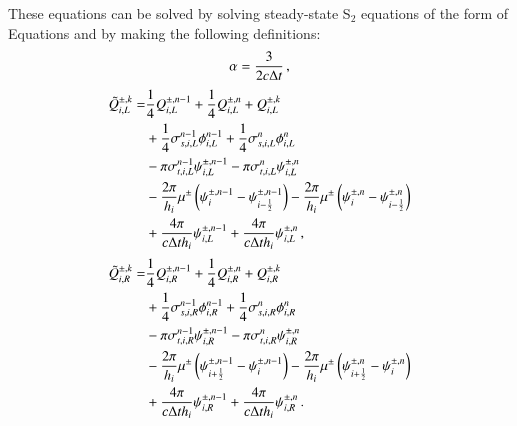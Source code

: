 \documentclass[preprint,12pt]{elsarticle}
\begin{document}
These equations can be solved by solving steady-state S$_2$ equations
of the form of Equations  and  by making
the following definitions:
\begin{equation}
\alpha = \frac{3}{2c\Delta t} \, ,
\end{equation}
\begin{equation}\begin{split}
\tilde{Q}_{i,L}^{\pm,k} = &
    \frac{1}{4} Q_{i,L}^{\pm,n-1} + \frac{1}{4} Q_{i,L}^{\pm,n} + Q_{i,L}^{\pm,k}\\
& + \frac{1}{4}\sigma_{s,i,L}^{n-1}\phi_{i,L}^{n-1} + \frac{1}{4}\sigma_{s,i,L}^n\phi_{i,L}^n \\
& - \pi\sigma_{t,i,L}^{n-1}\psi_{i,L}^{\pm,n-1} - \pi\sigma_{t,i,L}^{n}\psi_{i,L}^{\pm,n} \\
& - \frac{2\pi}{h_i}\mu^\pm\left( \psi^{\pm,n-1}_i - \psi^{\pm,n-1}_{i-\frac{1}{2}} \right)
  - \frac{2\pi}{h_i}\mu^\pm\left( \psi^{\pm,n}_i - \psi^{\pm,n}_{i-\frac{1}{2}} \right) \\
& + \frac{4\pi}{c\Delta t h_i}\psi_{i,L}^{\pm,n-1} + \frac{4\pi}{c\Delta t h_i}\psi_{i,L}^{\pm,n} \, ,
\end{split}\end{equation}
\begin{equation}\begin{split}
\tilde{Q}_{i,R}^{\pm,k} = &
    \frac{1}{4} Q_{i,R}^{\pm,n-1} + \frac{1}{4} Q_{i,R}^{\pm,n} + Q_{i,R}^{\pm,k}\\
& + \frac{1}{4}\sigma_{s,i,R}^{n-1}\phi_{i,R}^{n-1} + \frac{1}{4}\sigma_{s,i,R}^n\phi_{i,R}^n \\
& - \pi\sigma_{t,i,R}^{n-1}\psi_{i,R}^{\pm,n-1} - \pi\sigma_{t,i,R}^{n}\psi_{i,R}^{\pm,n} \\
& - \frac{2\pi}{h_i}\mu^\pm\left( \psi^{\pm,n-1}_{i+\frac{1}{2}} - \psi^{\pm,n-1}_{i} \right)
  - \frac{2\pi}{h_i}\mu^\pm\left( \psi^{\pm,n}_{i+\frac{1}{2}} - \psi^{\pm,n}_{i} \right) \\
& + \frac{4\pi}{c\Delta t h_i}\psi_{i,R}^{\pm,n-1} + \frac{4\pi}{c\Delta t h_i}\psi_{i,R}^{\pm,n} \, .
\end{split}\end{equation}
\end{document}
